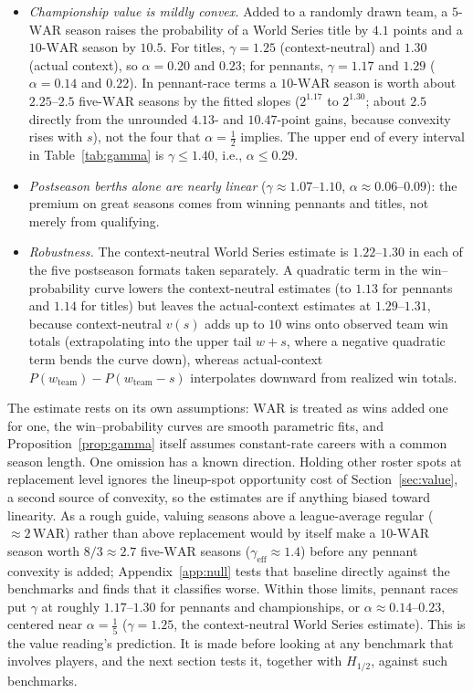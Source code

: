 \documentclass[11pt,letterpaper]{article}
\theoremstyle{plain}
\theoremstyle{definition}
\theoremstyle{remark}
\newcommand{\WAR}{\mathrm{WAR}}
\begin{document}
\begin{itemize}
    \item \emph{Championship value is mildly convex.} Added to a randomly drawn team, a $5$-$\WAR$ season raises the probability of a World Series title by $4.1$ points and a $10$-$\WAR$ season by $10.5$. For titles, $\gamma = 1.25$ (context-neutral) and $1.30$ (actual context), so $\alpha = 0.20$ and $0.23$; for pennants, $\gamma = 1.17$ and $1.29$ ($\alpha = 0.14$ and $0.22$). In pennant-race terms a $10$-$\WAR$ season is worth about $2.25$--$2.5$ five-$\WAR$ seasons by the fitted slopes ($2^{1.17}$ to $2^{1.30}$; about $2.5$ directly from the unrounded $4.13$- and $10.47$-point gains, because convexity rises with $s$), not the four that $\alpha = \tfrac12$ implies. The upper end of every interval in Table~\ref{tab:gamma} is $\gamma \le 1.40$, i.e., $\alpha \le 0.29$.
    \item \emph{Postseason berths alone are nearly linear} ($\gamma \approx 1.07$--$1.10$, $\alpha \approx 0.06$--$0.09$): the premium on great seasons comes from winning pennants and titles, not merely from qualifying.
    \item \emph{Robustness.} The context-neutral World Series estimate is $1.22$--$1.30$ in each of the five postseason formats taken separately. A quadratic term in the win--probability curve lowers the context-neutral estimates (to $1.13$ for pennants and $1.14$ for titles) but leaves the actual-context estimates at $1.29$--$1.31$, because context-neutral $v(s)$ adds up to $10$ wins onto observed team win totals (extrapolating into the upper tail $w + s$, where a negative quadratic term bends the curve down), whereas actual-context $P(w_{\mathrm{team}}) - P(w_{\mathrm{team}} - s)$ interpolates downward from realized win totals.
\end{itemize}
The estimate rests on its own assumptions: $\WAR$ is treated as wins added one for one, the win--probability curves are smooth parametric fits, and Proposition~\ref{prop:gamma} itself assumes constant-rate careers with a common season length. One omission has a known direction. Holding other roster spots at replacement level ignores the lineup-spot opportunity cost of Section~\ref{sec:value}, a second source of convexity, so the estimates are if anything biased toward linearity. As a rough guide, valuing seasons above a league-average regular ($\approx 2\,\WAR$) rather than above replacement would by itself make a $10$-$\WAR$ season worth $8/3 \approx 2.7$ five-$\WAR$ seasons ($\gamma_{\mathrm{eff}} \approx 1.4$) before any pennant convexity is added; Appendix~\ref{app:null} tests that baseline directly against the benchmarks and finds that it classifies worse. Within those limits, pennant races put $\gamma$ at roughly $1.17$--$1.30$ for pennants and championships, or $\alpha \approx 0.14$--$0.23$, centered near $\alpha = \tfrac15$ ($\gamma = 1.25$, the context-neutral World Series estimate). This is the value reading's prediction. It is made before looking at any benchmark that involves players, and the next section tests it, together with $H_{1/2}$, against such benchmarks.
\end{document}
